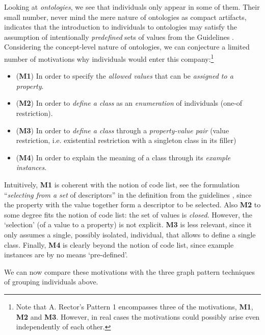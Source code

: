 Looking at \emph{ontologies}, we see that individuals only appear in some of them.
Their small number, never mind the mere nature of ontologies as compact artifacts, indicates that the introduction to individuals to ontologies may satisfy the assumption of intentionally \emph{predefined} sets of values from the Guidelines \cite{guide_code_list}. 
Considering the concept-level nature of ontologies, we can conjecture a limited number of motivations why individuals would enter this company:\footnote{Note that A. Rector's Pattern 1 \cite{alanrector} encompasses three of the motivations, \textbf{M1}, \textbf{M2} and \textbf{M3}. However, in real cases the motivations could possibly arise even independently of each other.}
\begin{itemize}
    \item (\textbf{M1}) In order to specify the \emph{allowed values} that can be \emph{assigned to a property}.
    \item (\textbf{M2}) In order to \emph{define a class} as an \emph{enumeration} of individuals (one-of restriction). 
    \item (\textbf{M3})  In order to \emph{define a class} through a \emph{property-value pair} (value restriction, i.e. existential restriction with a singleton class in its filler)  
    \item (\textbf{M4}) In order to explain the meaning of a class through its \emph{example instances}.
\end{itemize}
Intuitively, \textbf{M1}  is coherent with the notion of code list, see the formulation ``\emph{selecting from a set} of descriptors'' in the definition from the guidelines \cite{guide_code_list}, since the property with the value together form a descriptor to be selected.
Also  \textbf{M2} to some degree fits the notion of code list: the set of values is \emph{closed}.
However, the `selection' (of a value to a property) is not explicit.
\textbf{M3}  is less relevant, since it only assumes a single, possibly isolated, individual, that allows to define a single class.
Finally, \textbf{M4}  is clearly beyond the notion of code list, since example instances are by no means `pre-defined'.

We can now compare these motivations with the three graph pattern techniques of grouping individuals above. 

